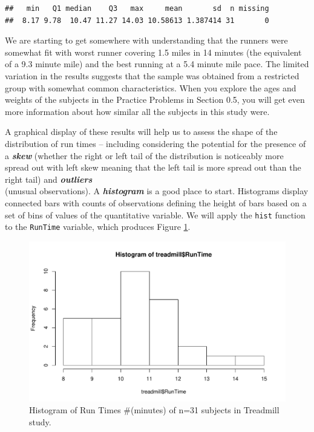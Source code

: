 \documentclass[]{article}
\newenvironment{Shaded}{\begin{snugshade}}{\end{snugshade}}
\newcommand{\KeywordTok}[1]{\textcolor[rgb]{0.13,0.29,0.53}{\textbf{{#1}}}}
\newcommand{\NormalTok}[1]{{#1}}
\begin{document}
\begin{verbatim}
##   min   Q1 median    Q3   max     mean       sd  n missing
##  8.17 9.78  10.47 11.27 14.03 10.58613 1.387414 31       0
\end{verbatim}

We are starting to get somewhere with understanding that the runners
were somewhat fit with worst runner covering 1.5 miles in 14 minutes
(the equivalent of a 9.3 minute mile) and the best running at a 5.4
minute mile pace. The limited variation in the results suggests that the
sample was obtained from a restricted group with somewhat common
characteristics. When you explore the ages and weights of the subjects
in the Practice Problems in Section 0.5, you will get even more
information about how similar all the subjects in this study were.

A graphical display of these results will help us to assess the shape of
the distribution of run times -- including considering the potential for
the presence of a \textbf{\emph{skew}} (whether the right or left tail
of the distribution is noticeably more spread out with left skew meaning
that the left tail is more spread out than the right tail) and
\textbf{\emph{outliers}}\\
(unusual observations). A \textbf{\emph{histogram }} is a good place to
start. Histograms display connected bars with counts of observations
defining the height of bars based on a set of bins of values of the
quantitative variable. We will apply the \texttt{hist} function to the
\texttt{RunTime} variable, which produces Figure \ref{fig:Figure5}.




\begin{Shaded}
\end{Shaded}

\begin{figure}[htbp]
\centering
\includegraphics{01-preface_files/figure-latex/Figure5-1.pdf}
\caption{\label{fig:Figure5}Histogram of Run Times \#(minutes) of n=31 subjects in
Treadmill study.}
\end{figure}
\end{document}
